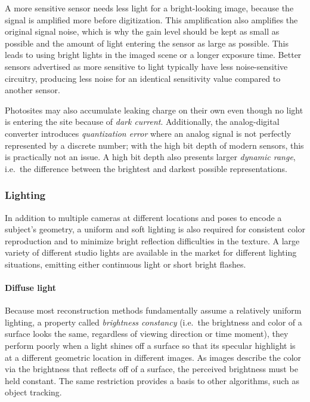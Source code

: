 A more sensitive sensor needs less light for a bright-looking image, because the signal is amplified more before digitization.
This amplification also amplifies the original signal noise, which is why the gain level should be kept as small as possible and the amount of light entering the sensor as large as possible.
This leads to using bright lights in the imaged scene or a longer exposure time.
Better sensors advertised as more sensitive to light typically have less noise-sensitive circuitry, producing less noise for an identical sensitivity value compared to another sensor.
\cite{el2005cmos}

Photosites may also accumulate leaking charge on their own even though no light is entering the site because of \emph{dark current}.
Additionally, the analog-digital converter introduces \emph{quantization error} where an analog signal is not perfectly represented by a discrete number; with the high bit depth of modern sensors, this is practically not an issue.
A high bit depth also presents larger \emph{dynamic range}, i.e.\ the difference between the brightest and darkest possible representations.
\cite{el2005cmos,litwiller2001ccd}



\subsubsection{Lighting} \label{sec:bg-lighting} %

In addition to multiple cameras at different locations and poses to encode a subject's geometry, a uniform and soft lighting is also required for consistent color reproduction and to minimize bright reflection difficulties in the texture.
A large variety of different studio lights are available in the market for different lighting situations, emitting either continuous light or short bright flashes.

\paragraph{Diffuse light}
Because most reconstruction methods fundamentally assume a relatively uniform lighting, a property called \emph{brightness constancy} (i.e.\ the brightness and color of a surface looks the same, regardless of viewing direction or time moment), they perform poorly when a light shines off a surface so that its specular highlight is at a different geometric location in different images.
\cite{szeliski10vision}
As images describe the color via the brightness that reflects off of a surface, the perceived brightness must be held constant.
The same restriction provides a basis to other algorithms, such as object tracking.
\cite{horn1974determining,horn1981determining}

